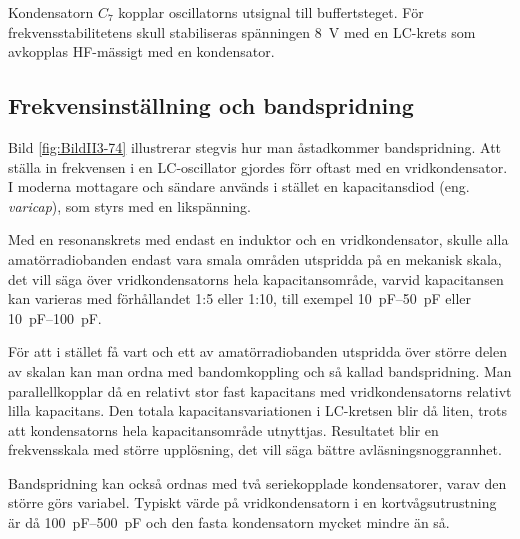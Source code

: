 Kondensatorn \(C_7\) kopplar oscillatorns utsignal till buffertsteget.
För frekvensstabilitetens skull stabiliseras spänningen \SI{8}{\volt} med en
LC-krets som avkopplas HF-mässigt med en kondensator.

\subsection{Frekvensinställning och bandspridning}


Bild \ref{fig:BildII3-74} illustrerar stegvis hur man åstadkommer
bandspridning.
Att ställa in frekvensen i en LC-oscillator gjordes förr oftast med en
vridkondensator.
I moderna mottagare och sändare används i stället en kapacitansdiod 
(eng. \emph{varicap}), som styrs med en likspänning.

Med en resonanskrets med endast en induktor och en vridkondensator, skulle
alla amatörradiobanden endast vara smala områden utspridda på en mekanisk
skala, det vill säga över vridkondensatorns hela kapacitansområde, varvid
kapacitansen kan varieras med förhållandet 1:5 eller 1:10, till exempel
\SIrange{10}{50}{\pico\farad} eller \SIrange{10}{100}{\pico\farad}.

För att i stället få vart och ett av amatörradiobanden utspridda över större
delen av skalan kan man ordna med bandomkoppling och så kallad bandspridning.
Man parallellkopplar då en relativt stor fast kapacitans med vridkondensatorns
relativt lilla kapacitans.
Den totala kapacitansvariationen i LC-kretsen blir då liten, trots att
kondensatorns hela kapacitansområde utnyttjas.
Resultatet blir en frekvensskala med större upplösning, det vill säga bättre
avläsningsnoggrannhet.

Bandspridning kan också ordnas med två seriekopplade kondensatorer,
varav den större görs variabel.
Typiskt värde på vridkondensatorn i en kortvågsutrustning är då
\SIrange{100}{500}{\pico\farad} och den fasta kondensatorn mycket mindre än så.
